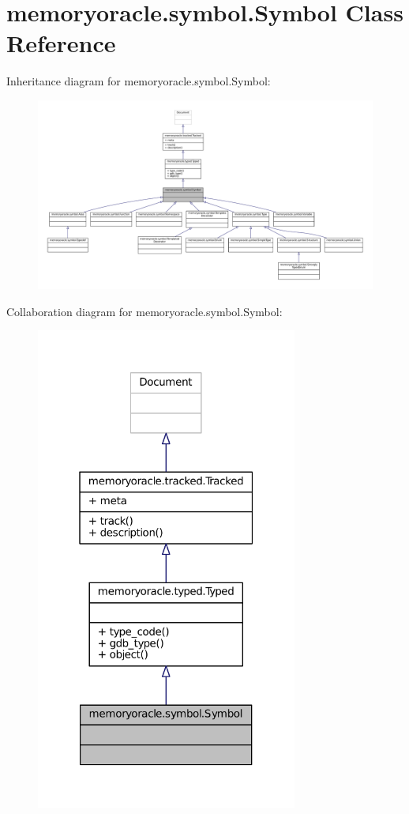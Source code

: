 \hypertarget{classmemoryoracle_1_1symbol_1_1Symbol}{}\section{memoryoracle.\+symbol.\+Symbol Class Reference}
\label{classmemoryoracle_1_1symbol_1_1Symbol}


Inheritance diagram for memoryoracle.\+symbol.\+Symbol\+:
\nopagebreak
\begin{figure}[H]
\begin{center}
\leavevmode
\includegraphics[width=350pt]{classmemoryoracle_1_1symbol_1_1Symbol__inherit__graph}
\end{center}
\end{figure}


Collaboration diagram for memoryoracle.\+symbol.\+Symbol\+:
\nopagebreak
\begin{figure}[H]
\begin{center}
\leavevmode
\includegraphics[width=244pt]{classmemoryoracle_1_1symbol_1_1Symbol__coll__graph}
\end{center}
\end{figure}
